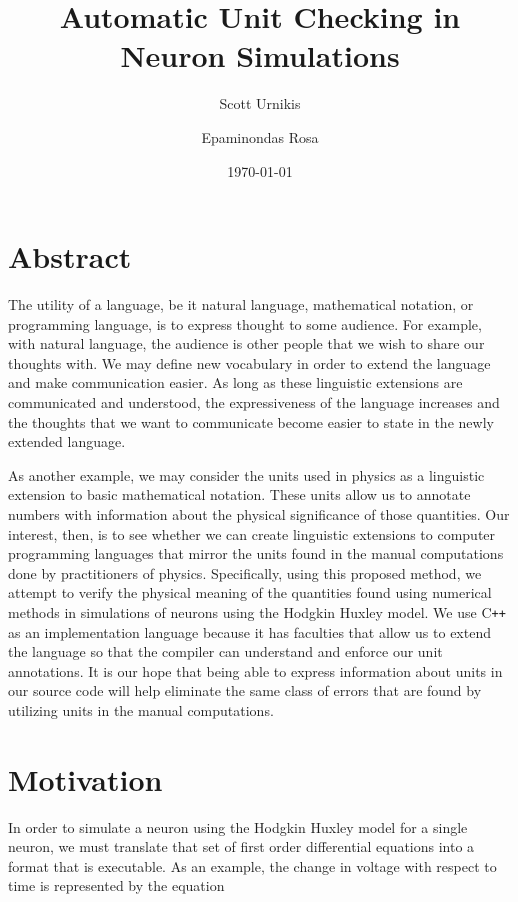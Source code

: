 \documentclass[reprint]{revtex4-1}
\begin{document}
\title{Automatic Unit Checking in Neuron Simulations}
\date{\today}
\author{Scott Urnikis}
\author{Epaminondas Rosa}

\maketitle
\section*{Abstract}
The utility of a language, be it natural language, mathematical
notation, or programming language, is to express thought to some audience. For
example, with natural language, the audience is other people that we wish to
share our thoughts with. We may define new vocabulary in order to extend the
language and make communication easier. As long as these linguistic extensions
are communicated and understood, the expressiveness of the language increases
and the thoughts that we want to communicate become easier to state in the newly
extended language.

As another example, we may consider the units used in physics as a linguistic
extension to basic mathematical notation. These units allow us to annotate
numbers with information about the physical significance of those quantities.
Our interest, then, is to see whether we can create linguistic extensions to
computer programming languages that mirror the units found in the manual
computations done by practitioners of physics. Specifically, using this proposed
method, we attempt to verify the physical meaning of the quantities found using
numerical methods in simulations of neurons using the Hodgkin Huxley model.
We use C\verb!++! as an implementation language because it has faculties that allow us
to extend the language so that the compiler can understand and enforce
our unit annotations. It is our hope that being able to express information
about units in our source code will help eliminate the same class of errors that
are found by utilizing units in the manual computations.

\section{Motivation}
In order to simulate a neuron using the Hodgkin Huxley model for a single neuron, we must
translate that set of first order differential equations into a format that is executable.
As an example, the change in voltage with respect to time is represented by the equation
\end{document}
